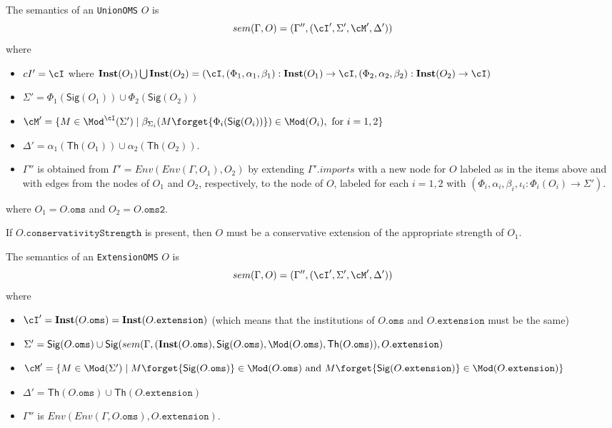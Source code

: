 \documentclass[10pt, a4paper]{isov2}
\newcommand*{\syntax}[1]{\texttt{#1}}
\newcommand{\Sig}{\mathsf{Sig}}
\renewcommand{\Th}{\mathsf{Th}}
\newcommand{\Inst}{\ensuremath{\mathbf{Inst}}}
\begin{document}
The semantics of an \syntax{UnionOMS} $O$ is
$$sem(\Gamma, O) = (\Gamma'',(\cI',\Sigma',\cM',\Delta'))$$
\noindent where
 \begin{itemize} 
  \item $\\cI' = \cI$ where
    $\Inst(O_1) \bigcup \Inst(O_2) =(\cI, (\Phi_1, \alpha_1,\beta_1) : \Inst(O_1) \rightarrow \cI, 
                    (\Phi_2, \alpha_2,\beta_2) : \Inst(O_2) \rightarrow \cI)$
  \item $\Sigma' = \Phi_1(\Sig(O_1)) \cup \Phi_2(\Sig(O_2))$
  \item $\cM' = \{ M\in \Mod^\cI(\Sigma') \mid \beta_{\Sigma_i}(M\forget{\Phi_i(\Sig(O_i))}) \in \Mod(O_i), \text{ for } i=1,2 \}$
  \item $\Delta' = \alpha_1(\Th(O_1)) \cup \alpha_2(\Th(O_2))$.
    \item 
        $\Gamma''$ is obtained from 
       $\Gamma' = Env(Env(\Gamma,O_1), O_2)$
       by extending $\Gamma'.imports$
       with a new node for $O$ labeled as in the items above and
       with edges from the nodes of $O_1$ and $O_2$,
       respectively, to the node of $O$,
        labeled for each $i=1,2$ with
        $(\Phi_i, \alpha_i,\beta_i, \iota_i: \Phi_i(O_i) \to \Sigma')$.
 \end{itemize} 
where $O_1 = O.\syntax{oms}$ and $O_2 = O.\syntax{oms2}$. 

If $O.\syntax{conservativityStrength}$ is present, then $O$ must be a conservative extension
of the appropriate strength of $O_1$.


The semantics of an \syntax{ExtensionOMS} $O$ is
$$sem(\Gamma, O) = (\Gamma'',(\cI',\Sigma',\cM',\Delta'))$$
\noindent where
 \begin{itemize} 
  \item $\cI' = \Inst(O.\syntax{oms}) = \Inst(O.\syntax{extension})$ 
  (which means that
  the institutions of $O.\syntax{oms}$ and 
  $O.\syntax{extension}$ must be the same)
  \item $\Sigma' = \Sig(O.\syntax{oms}) \cup 
  \Sig(sem(\Gamma, 
       (\Inst(O.\syntax{oms}), \Sig(O.\syntax{oms}), \Mod(O.\syntax{oms}), \Th(O.\syntax{oms}) ),
  O.\syntax{extension})$
  \item $\cM' = \{ M\in \Mod(\Sigma') \mid M\forget{\Sig(O.\syntax{oms})} \in \Mod(O.\syntax{oms})
  \text{ and }
  M \forget{\Sig(O.\syntax{extension})} \in \Mod(O.\syntax{extension})\}$
  \item $\Delta' = \Th(O.\syntax{oms}) \cup \Th(O.\syntax{extension})$
  \item $\Gamma''$ is $Env(Env(\Gamma, O.\syntax{oms}), O.\syntax{extension})$.
 \end{itemize} 
\end{document}
